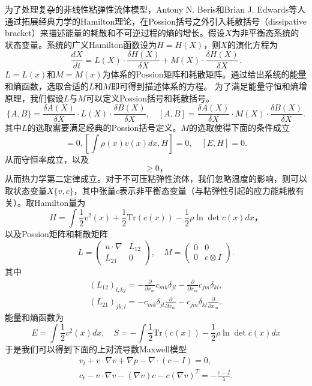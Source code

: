\documentclass{article}
\begin{document}
为了处理复杂的非线性粘弹性流体模型，Antony N. Beris和Brian J. Edwards等人通过拓展经典力学的Hamilton理论，在Possion括号之外引入耗散括号（dissipative bracket）来描述能量的耗散和不可逆过程的熵的增长\cite{}。假设$X$为非平衡态系统的状态变量。系统的广义Hamilton函数设为$H=H(X)$，则$X$的演化方程为
\begin{equation*}
	\frac{dX}{dt} = L(X) \cdot \frac{\delta H(X)}{\delta X} + M(X) \cdot \frac{\delta H(X)}{\delta X} . 
\end{equation*}
$L=L(x)$和$M=M(x)$为体系的Possion矩阵和耗散矩阵。通过给出系统的能量和熵函数，选取合适的$L$和$M$即可得到描述体系的方程。 为了满足能量守恒和熵增原理，我们假设$L$与$M$可以定义Possion括号和耗散括号。
\begin{equation*}
	\{ A,B \} = \frac{\delta A(X)}{\delta X} \cdot L(X) \cdot \frac{\delta B(X)}{\delta X}, \quad  [ A,B ] = \frac{\delta A(X)}{\delta X} \cdot M(X) \cdot \frac{\delta B(X)}{\delta X}. 
\end{equation*}
其中$L$的选取需要满足经典的Possion括号定义。$M$的选取使得下面的条件成立
\begin{equation*}
	[\int \rho(x) dx, H]=0,[\int \rho(x) v(x) dx, H]=0, \quad [E,H] = 0.
\end{equation*}
从而守恒率成立，以及
\begin{equation*}
	[S,H] \ge 0，
\end{equation*}
从而热力学第二定律成立。对于不可压粘弹性流体，我们忽略温度的影响，则可以取状态变量$X 
 \{v,c\}$，其中张量$c$表示非平衡态变量（与粘弹性引起的应力能耗散有关）。取Hamilton量为
 \begin{equation*}
 	H = \int \frac{1}{2} v^2(x) + \frac{1}{2} \mbox{
 	Tr}(c(x))- \frac{1}{2} \rho \ln \det c(x) dx，
 \end{equation*}
以及Possion矩阵和耗散矩阵
\begin{equation*}
	L = \left( \begin{array}{cc} 
			u \cdot \nabla &  L_{12} \\
			L_{21}& 0
		\end{array}\right), \quad
	M =	\left( \begin{array}{cc} 
			0  & 0 \\
			0  & c \otimes I
		\end{array}\right).
\end{equation*}
其中
\begin{eqnarray*}
	(L_{12})_{l,kj} = - \frac{\partial}{\partial x_m} c_{mk} \delta_{jl} -  \frac{\partial}{\partial x_m} c_{jm} \delta_{kl}, \\
	(L_{21})_{jk,l} = -c_{mk} \delta_{jl} \frac{\partial}{\partial x_m} - c_{jm} \delta_{kl} \frac{\partial}{\partial x_m}.
\end{eqnarray*}
能量和熵函数为
\begin{equation*}
	E = \int \frac{1}{2} v^2(x)dx, \quad S = -\int \frac{1}{2} \mbox{
 	Tr}(c(x))- \frac{1}{2} \rho \ln \det c(x) dx
\end{equation*}
于是我们可以得到下面的上对流导数Maxwell模型
\begin{eqnarray*}
	v_t + v \cdot \nabla v + \nabla p  - \nabla \cdot (c - I) = 0, \\
	c_t - v \cdot \nabla v - (\nabla v)c - c (\nabla v)^T = -\frac{c-I}{\lambda}.
\end{eqnarray*}
\end{document}

